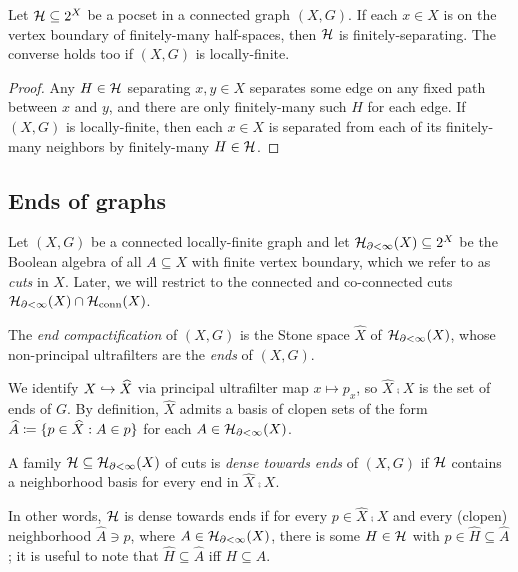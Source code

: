 \documentclass[reqno]{amsart}
\begin{document}
    \begin{lemma}\label{lem:finitely_separating_iff_on_boundary_of_finite}
        Let $\mathcal{H}\subseteq2^X$ be a pocset in a connected graph $(X,G)$. If each $x\in X$ is on the vertex boundary of finitely-many half-spaces, then $\mathcal{H}$ is finitely-separating. The converse holds too if $(X,G)$ is locally-finite.
    \end{lemma}
    \begin{proof}
    Any $H\in\mathcal{H}$ separating $x,y\in X$ separates some edge on any fixed path between $x$ and $y$, and there are only finitely-many such $H$ for each edge. If $(X,G)$ is locally-finite, then each $x\in X$ is separated from each of its finitely-many neighbors by finitely-many $H\in\mathcal{H}$.
    \end{proof}

    \subsection{Ends of graphs}

    Let $(X,G)$ be a connected locally-finite graph and let $\mathcal{H}_{\partial<\infty}(X)\subseteq2^X$ be the Boolean algebra of all $A\subseteq X$ with finite vertex boundary, which we refer to as \textit{cuts} in $X$. Later, we will restrict to the connected and co-connected cuts $\mathcal{H}_{\partial<\infty}(X)\cap\mathcal{H}_\mathrm{conn}(X)$.

    \begin{definition}
        The \textit{end compactification} of $(X,G)$ is the Stone space $\widehat{X}$ of $\mathcal{H}_{\partial<\infty}(X)$, whose non-principal ultrafilters are the \textit{ends} of $(X,G)$.
    \end{definition}

    We identify $X\hookrightarrow\widehat{X}$ via principal ultrafilter map $x\mapsto p_x$, so $\widehat{X}\comp X$ is the set of ends of $G$. By definition, $\widehat{X}$ admits a basis of clopen sets of the form $\widehat{A}\coloneqq\{p\in\widehat{X}: A\in p\}$ for each $A\in\mathcal{H}_{\partial<\infty}(X)$.

    \begin{definition}
        A family $\mathcal{H}\subseteq\mathcal{H}_{\partial<\infty}(X)$ of cuts is \textit{dense towards ends} of $(X,G)$ if $\mathcal{H}$ contains a neighborhood basis for every end in $\widehat{X}\comp X$.

        In other words, $\mathcal{H}$ is dense towards ends if for every $p\in\widehat{X}\comp X$ and every (clopen) neighborhood $\widehat{A}\ni p$, where $A\in\mathcal{H}_{\partial<\infty}(X)$, there is some $H\in\mathcal{H}$ with $p\in\widehat{H}\subseteq\widehat{A}$; it is useful to note that $\widehat{H}\subseteq\widehat{A}$ iff $H\subseteq A$.
    \end{definition}
\end{document}
